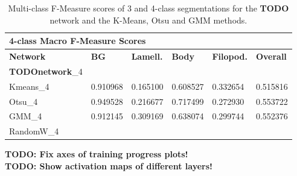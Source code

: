 \begin {table}
\begin{flushleft}
\begin {tabular}[!htb]{|l|l|l|l|l|l|}
			\multicolumn{6}{|l|}{\textbf{4-class Macro F-Measure Scores}} \\ \hline
			\textbf{Network}& \textbf{BG}& \textbf{Lamell.}& \textbf{Body}& \textbf{Filopod.}& \textbf{Overall} \\ \hline
			\textbf{TODOnetwork}\_4& & & & &  \\ \hline
			Kmeans\_4& 0.910968& 0.165100& 0.608527& 0.332654& 0.515816 \\ \hline
			Otsu\_4& 0.949528& 0.216677& 0.717499& 0.272930& 0.553722 \\ \hline
			GMM\_4& 0.912145& 0.309169& 0.638074& 0.299744& 0.552376 \\ \hline
			RandomW\_4& & & & & \\ \hline
		\end {tabular}
	\end {flushleft}
\caption[Multi-class F-Measure scores for final network and other image segmentation metods.]{Multi-class F-Measure scores of 3 and 4-class segmentations for the \textbf{TODO} network and the K-Means, Otsu and GMM methods.}
\label{tab:resultsfinal}
\end {table}

\textbf{TODO: Fix axes of training progress plots!}\\
\textbf{TODO: Show activation maps of different layers!}\\